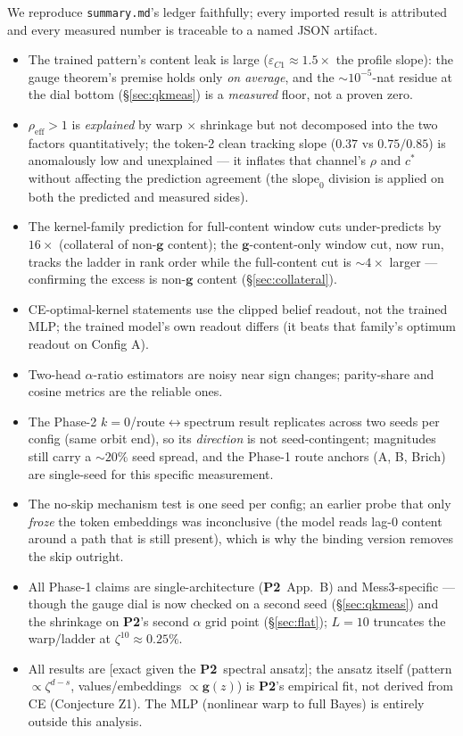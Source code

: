 \documentclass{article}
\newcommand{\gb}{\boldsymbol{g}}
\newcommand{\htag}[1]{{\normalfont\sffamily\footnotesize[#1]}}
\newcommand{\Ptwo}{\textbf{P2}}
\begin{document}
We reproduce \texttt{summary.md}'s ledger faithfully; every imported result is
attributed and every measured number is traceable to a named JSON artifact.
\begin{itemize}
\item The trained pattern's content leak is large ($\varepsilon_{C1}\approx1.5\times$
the profile slope): the gauge theorem's premise holds only \emph{on average}, and the
$\sim\!10^{-5}$-nat residue at the dial bottom (\S\ref{sec:qkmeas}) is a
\emph{measured} floor, not a proven zero.
\item $\rho_{\mathrm{eff}}>1$ is \emph{explained} by warp $\times$ shrinkage but not
decomposed into the two factors quantitatively; the token-2 clean tracking slope
($0.37$ vs $0.75/0.85$) is anomalously low and unexplained --- it inflates that
channel's $\rho$ and $c^\ast$ without affecting the prediction agreement (the
$\mathrm{slope}_0$ division is applied on both the predicted and measured sides).
\item The kernel-family prediction for full-content window cuts under-predicts by
$16\times$ (collateral of non-$\gb$ content); the $\gb$-content-only window cut, now
run, tracks the ladder in rank order while the full-content cut is ${\sim}4\times$
larger --- confirming the excess is non-$\gb$ content (\S\ref{sec:collateral}).
\item CE-optimal-kernel statements use the clipped belief readout, not the trained
MLP; the trained model's own readout differs (it beats that family's optimum readout
on Config A).
\item Two-head $\alpha$-ratio estimators are noisy near sign changes; parity-share and
cosine metrics are the reliable ones.
\item The Phase-2 $k{=}0$/route$\leftrightarrow$spectrum result replicates across two
seeds per config (same orbit end), so its \emph{direction} is not seed-contingent;
magnitudes still carry a ${\sim}20\%$ seed spread, and the Phase-1 route anchors (A, B,
Brich) are single-seed for this specific measurement.
\item The no-skip mechanism test is one seed per config; an earlier probe that only
\emph{froze} the token embeddings was inconclusive (the model reads lag-0 content around
a path that is still present), which is why the binding version removes the skip outright.
\item All Phase-1 claims are single-architecture (\Ptwo\ App.\ B) and Mess3-specific ---
though the gauge dial is now checked on a second seed (\S\ref{sec:qkmeas}) and the
shrinkage on \Ptwo's second $\alpha$ grid point (\S\ref{sec:flat}); $L=10$ truncates the
warp/ladder at $\zeta^{10}\approx0.25\%$.
\item All results are \htag{exact given the \Ptwo\ spectral ansatz}; the ansatz itself
(pattern $\propto\zeta^{d-s}$, values/embeddings $\propto\gb(z)$) is \Ptwo's empirical
fit, not derived from CE (Conjecture Z1). The MLP (nonlinear warp to full Bayes) is
entirely outside this analysis.
\end{itemize}
\end{document}
